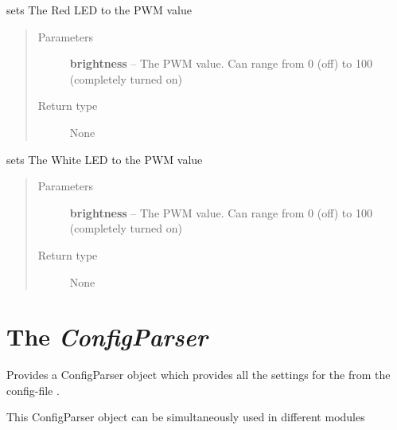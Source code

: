 \documentclass[a4paper,10pt,openany,oneside]{sphinxmanual}
\begin{document}

\begin{fulllineitems}
\label{index:scripts.leds.setRed}
sets The Red LED to the PWM value 
\begin{quote}\begin{description}
\item[{Parameters}] \leavevmode
\textbf{brightness} -- The PWM value. Can range from 0 (off) to 100 (completely turned on)

\item[{Return type}] \leavevmode
None

\end{description}\end{quote}

\end{fulllineitems}


\begin{fulllineitems}
\label{index:scripts.leds.setWhite}
sets The White LED to the PWM value 
\begin{quote}\begin{description}
\item[{Parameters}] \leavevmode
\textbf{brightness} -- The PWM value. Can range from 0 (off) to 100 (completely turned on)

\item[{Return type}] \leavevmode
None

\end{description}\end{quote}

\end{fulllineitems}



\section{The \emph{ConfigParser}}
\label{index:module-scripts.config}\label{index:the-configparser}
Provides a ConfigParser object which provides all the settings for the 
from the config-file .

This ConfigParser object can be simultaneously used in different modules
\end{document}
